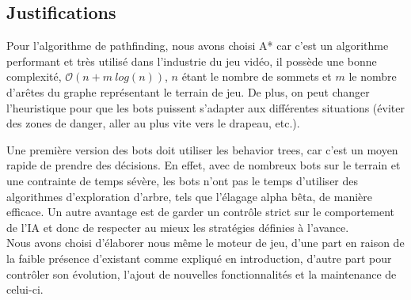 \newpage
\subsection{Justifications}

Pour l'algorithme de pathfinding, nous avons choisi A* car c'est un algorithme performant et très utilisé dans l'industrie du jeu vidéo, il possède une bonne complexité, $\mathcal{O}(n + m\ log(n))$, $n$ étant le nombre de sommets et $m$ le nombre d'arêtes du graphe représentant le terrain de jeu. De plus, on peut changer l'heuristique pour que les bots puissent s'adapter aux différentes situations (éviter des zones de danger, aller au plus vite vers le drapeau, etc.). \newline

Une première version des bots doit utiliser les behavior trees, car c'est un moyen rapide de prendre des décisions. En effet, avec de nombreux bots sur le terrain et une contrainte de temps sévère, les bots n'ont pas le temps d'utiliser des algorithmes d'exploration d'arbre, tels que l'élagage alpha bêta, de manière efficace. Un autre avantage est de garder un contrôle strict sur le comportement de l'IA et donc de respecter au mieux les stratégies définies à l'avance.\\

Nous avons choisi d'élaborer nous même le moteur de jeu, d'une part en raison de la faible présence d'existant comme expliqué en introduction, d'autre part pour contrôler son évolution, l'ajout de nouvelles fonctionnalités et la maintenance de celui-ci.
